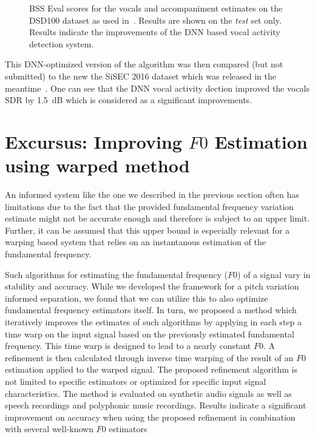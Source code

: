 \begin{figure}
  \centering
  
  \caption{BSS Eval scores for the vocals and accompaniment estimates on the DSD100 dataset as used in~\cite{liutkus17}. Results are shown on the \emph{test} set only. Results indicate the improvements of the DNN based vocal activity detection system.}
  \label{fig:05_comparison_sto_stodnn}
\end{figure}

This DNN-optimized version of the algorithm was then compared (but not submitted) to the new the SiSEC 2016 dataset which was released in the meantime~\cite{liutkus17}.
One can see that the DNN vocal activity dection improved the vocals SDR by 1.5~dB which is considered as a significant improvements.

\section{Excursus: Improving $F0$ Estimation using warped method} %
\label{sec:method}




An informed system like the one we described in the previous section often has limitations due to the fact that the provided fundamental frequency variation estimate might not be accurate enough and therefore is subject to an upper limit.
Further, it can be assumed that this upper bound is especially relevant for a warping based system that relies on an instantanous estimation of the fundamental frequency.
\par
Such algorithms for estimating the fundamental frequency ($F0$) of a signal vary in stability and accuracy.
While we developed the framework for a pitch variation informed separation, we found that we can utilize this to also optimize fundamental frequency estimators itself.
In turn, we proposed a method which iteratively improves the estimates of such algorithms by applying in each step a time warp on the input signal based on the previously estimated fundamental frequency.
This time warp is designed to lead to a nearly constant $F0$. A refinement is then calculated through inverse time warping of the result of an $F0$ estimation applied to the warped signal. The proposed refinement algorithm is not limited to specific estimators or optimized for specific input signal characteristics. The method is evaluated on synthetic audio signals as well as speech recordings and polyphonic music recordings. Results indicate a significant improvement on accuracy when using the proposed refinement in combination with several well-known $F0$ estimators

